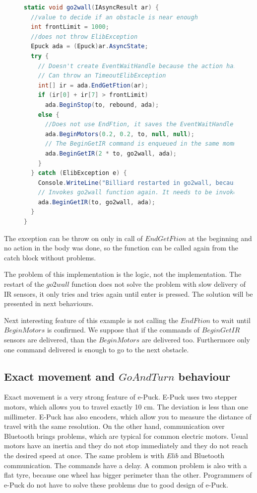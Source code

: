 \begin{figure}[!hbp]
\begin{lstlisting}[language=cs]
static void go2wall(IAsyncResult ar) {
  //value to decide if an obstacle is near enough
  int frontLimit = 1000;  
  //does not throw ElibException
  Epuck ada = (Epuck)ar.AsyncState;
  try {
    // Doesn't create EventWaitHandle because the action has already completed synchronously.
    // Can throw an TimeoutElibException
    int[] ir = ada.EndGetFtion(ar);    
    if (ir[0] + ir[7] > frontLimit)
      ada.BeginStop(to, rebound, ada);
    else {
      //Does not use EndFtion, it saves the EventWaitHandle. We suppose, that it succeeds now or in next rounds.
      ada.BeginMotors(0.2, 0.2, to, null, null);
      // The BeginGetIR command is enqueued in the same momment as BeginMotors, therefor double timeout is used.
      ada.BeginGetIR(2 * to, go2wall, ada);
    }
  } catch (ElibException e) {
    Console.WriteLine("Billiard restarted in go2wall, because of exception:\n" + e.Message);
    // Invokes go2wall function again. It needs to be invoked by BeginGetIR command, because it expects ar with IR values.
    ada.BeginGetIR(to, go2wall, ada);
  }
}
\end{lstlisting}
\caption{\label{fig:restart} } 
\end{figure}

  The exception can be throw on only in call of $EndGetFtion$ at the beginning and 
  no action in the body was done, so the function can be called again from the catch block without problems.

  The problem of this implementation is the logic, not the implementation. 
  The restart of the $go2wall$ function does not solve the problem with 
  slow delivery of IR sensors, it only tries and tries again until enter is pressed.
  The solution will be presented in next behaviours.

  Next interesting feature of this example is not calling the $EndFtion$ to wait until $BeginMotors$ is confirmed.
  We suppose that if the commands of $BeginGetIR$ sensors are delivered, than the $BeginMotors$ are delivered too.
  Furthermore only one command delivered is enough to go to the next obstacle.

\subsection{Exact movement and $GoAndTurn$ behaviour} \label{sec:go}
  Exact movement is a very strong feature of e-Puck. E-Puck uses two stepper motors,
  which allows you to travel exactly 10 cm. The deviation is less than one millimeter.
  E-Puck has also encoders, which allow you to measure the distance of travel with the same resolution.
  On the other hand, communication over Bluetooth brings problems, which are typical for common electric motors.
  Usual motors have an inertia and they do not stop immediately and they do not reach the desired speed at once. The same problem is with 
  {\it Elib} and Bluetooth communication. The commands have a delay.
  A common problem is also with a flat tyre, because one wheel has bigger perimeter than the other.
  Programmers of e-Puck do not have to solve these problems due to good design of e-Puck.

